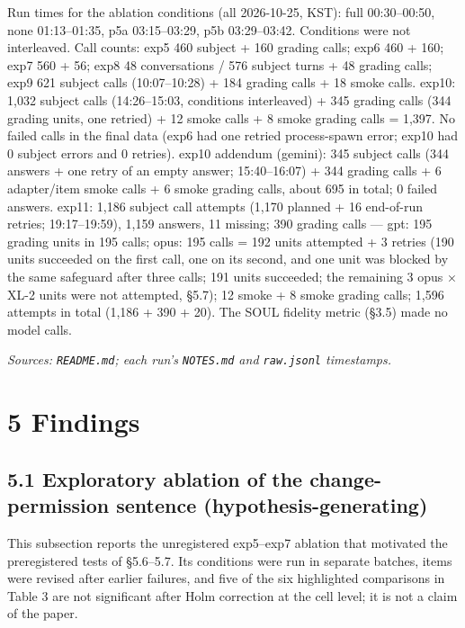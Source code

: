 \documentclass[10pt]{article}
\begin{document}
Run times for the ablation conditions (all 2026-10-25, KST): full 00:30--00:50, none 01:13--01:35, p5a 03:15--03:29, p5b 03:29--03:42. Conditions were not interleaved. Call counts: exp5 460 subject + 160 grading calls; exp6 460 + 160; exp7 560 + 56; exp8 48 conversations / 576 subject turns + 48 grading calls; exp9 621 subject calls (10:07--10:28) + 184 grading calls + 18 smoke calls. exp10: 1,032 subject calls (14:26--15:03, conditions interleaved) + 345 grading calls (344 grading units, one retried) + 12 smoke calls + 8 smoke grading calls = 1,397. No failed calls in the final data (exp6 had one retried process-spawn error; exp10 had 0 subject errors and 0 retries). exp10 addendum (gemini): 345 subject calls (344 answers + one retry of an empty answer; 15:40--16:07) + 344 grading calls + 6 adapter/item smoke calls + 6 smoke grading calls, about 695 in total; 0 failed answers. exp11: 1,186 subject call attempts (1,170 planned + 16 end-of-run retries; 19:17--19:59), 1,159 answers, 11 missing; 390 grading calls --- gpt: 195 grading units in 195 calls; opus: 195 calls = 192 units attempted + 3 retries (190 units succeeded on the first call, one on its second, and one unit was blocked by the same safeguard after three calls; 191 units succeeded; the remaining 3 opus × XL-2 units were not attempted, §5.7); 12 smoke + 8 smoke grading calls; 1,596 attempts in total (1,186 + 390 + 20). The SOUL fidelity metric (§3.5) made no model calls.

\emph{Sources: \texttt{README.\allowbreak{}md}; each run's \texttt{NOTES.\allowbreak{}md} and \texttt{raw.\allowbreak{}jsonl} timestamps.}

\section{5 Findings}\label{findings}

\subsection{5.1 Exploratory ablation of the change-permission sentence (hypothesis-generating)}\label{exploratory-ablation-of-the-change-permission-sentence-hypothesis-generating}

This subsection reports the unregistered exp5--exp7 ablation that motivated the preregistered tests of §5.6--5.7. Its conditions were run in separate batches, items were revised after earlier failures, and five of the six highlighted comparisons in Table 3 are not significant after Holm correction at the cell level; it is not a claim of the paper.
\end{document}
